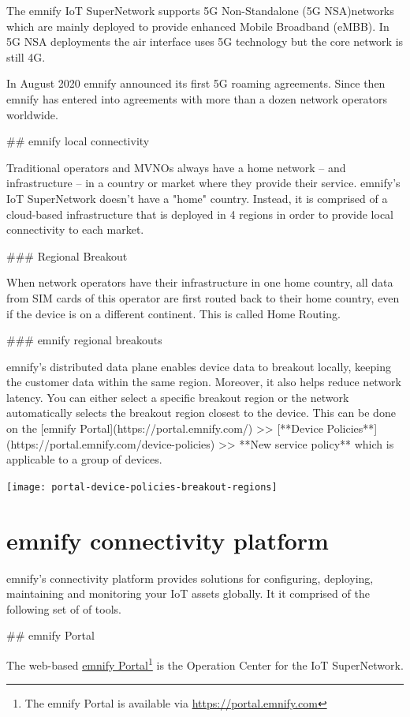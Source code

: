 \documentclass[11pt, oneside]{article}   	%
\newcommand{\addspace}{\vspace{2mm}}
\begin{document}
\begin{markdown}
  The emnify IoT SuperNetwork supports 5G Non-Standalone (5G NSA)networks which are mainly deployed to provide enhanced Mobile Broadband (eMBB).
  In 5G NSA deployments the air interface uses 5G technology but the core network is still 4G.
  
  In August 2020 emnify announced its first 5G roaming agreements.
  Since then emnify has entered into agreements with more than a dozen network operators worldwide.

## emnify local connectivity

Traditional operators and MVNOs always have a home network -- and infrastructure -- in a country or market where they provide their service. 
emnify's IoT SuperNetwork doesn't have a "home" country.
Instead, it is comprised of a cloud-based infrastructure that is deployed in 4 regions in order to provide local connectivity to each market. 

### Regional Breakout 

When network operators have their infrastructure in one home country, all data from SIM cards of this operator are first routed back to their home country, even if the device is on a different continent.
This is called Home Routing.


### emnify regional breakouts

emnify's distributed data plane enables device data to breakout locally, keeping the customer data within the same region.
Moreover, it also helps reduce network latency.
You can either select a specific breakout region or the network automatically selects the breakout region closest to the device.
This can be done on the [emnify Portal](https://portal.emnify.com/) >> [**Device Policies**](https://portal.emnify.com/device-policies) >> **New service policy** which is applicable to a group of devices.

\end{markdown}

\begin{center}
  \addspace
  \texttt{[image: portal-device-policies-breakout-regions]}
\end{center}

\pagebreak[4]

\section{emnify connectivity platform}

\begin{markdown}

emnify's connectivity platform provides solutions for configuring, deploying, maintaining and monitoring your IoT assets globally.
It it comprised of the following set of of tools.

## emnify Portal

\end{markdown}
The web-based \href{https://portal.emnify.com}{emnify Portal}\footnote{The emnify Portal is available via \href{https://portal.emnify.com}{https://portal.emnify.com}} is the Operation Center for the IoT SuperNetwork.
\end{document}
